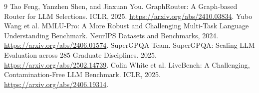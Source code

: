 \documentclass{article}
\begin{document}
\begin{thebibliography}{9}
 Tao Feng, Yanzhen Shen, and Jiaxuan You. GraphRouter: A Graph-based Router for LLM Selections. ICLR, 2025. \url{https://arxiv.org/abs/2410.03834}.
 Yubo Wang et al. MMLU-Pro: A More Robust and Challenging Multi-Task Language Understanding Benchmark. NeurIPS Datasets and Benchmarks, 2024. \url{https://arxiv.org/abs/2406.01574}.
 SuperGPQA Team. SuperGPQA: Scaling LLM Evaluation across 285 Graduate Disciplines. 2025. \url{https://arxiv.org/abs/2502.14739}.
 Colin White et al. LiveBench: A Challenging, Contamination-Free LLM Benchmark. ICLR, 2025. \url{https://arxiv.org/abs/2406.19314}.
\end{thebibliography}
\end{document}
